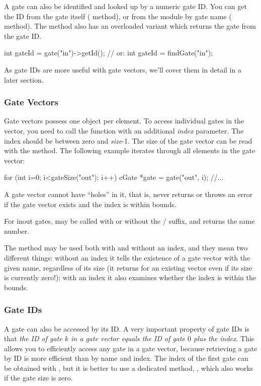 A gate can also be identified and looked up by a numeric gate ID.
You can get the ID from the gate itself ( method),
or from the module by gate name ( method).
The  method also has an overloaded variant which
returns the gate from the gate ID.

\begin{cpp}
int gateId = gate("in")->getId();  // or:
int gateId = findGate("in");
\end{cpp}

As gate IDs are more useful with gate vectors, we'll cover them
in detail in a later section.


\subsubsection{Gate Vectors}

Gate vectors possess one  object per element.
To access individual gates in the vector, you need to call
the  function with an additional \textit{index}
parameter. The index should be between zero and \textit{size}-1.
The size of the gate vector can be read with the 
method. The following example iterates through all elements in the
gate vector:

\begin{cpp}
for (int i=0; i<gateSize("out"); i++) {
    cGate *gate = gate("out", i);
    //...
}
\end{cpp}

A gate vector cannot have ``holes'' in it, that is, 
never returns  or throws an error if the gate vector exists
and the index is within bounds.

For inout gates,  may be called with or without
the / suffix, and returns the same number.

The  method may be used both with and without an
index, and they mean two different things: without an index it tells
the existence of a gate vector with the given name, regardless of its
size (it returns  for an existing vector even if its size
is currently zero!); with an index it also examines whether the index
is within the bounds.


\subsubsection{Gate IDs}

A gate can also be accessed by its ID. A very important property of gate IDs
is that \textit{the ID of gate $k$ in a gate vector equals the ID of gate $0$ plus the index}.
This allows you to efficiently access any gate in a gate vector, because
retrieving a gate by ID is more efficient than by name and index.
The index of the first gate can be obtained with ,
but it is better to use a dedicated method, ,
which also works if the gate size is zero.

